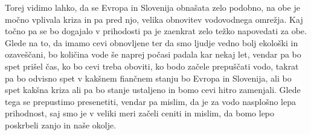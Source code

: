 \documentclass[11pt,a4paper]{article}
\begin{document}
Torej vidimo lahko, da se Evropa in Slovenija obnašata zelo podobno, na obe je močno vplivala kriza in pa pred njo, velika obnovitev vodovodnega omrežja. Kaj točno pa se bo dogajalo v prihodosti pa je zaenkrat zelo težko napovedati za obe. Glede na to, da imamo cevi obnovljene ter da smo ljudje vedno bolj ekološki in ozaveščani, bo količina vode še naprej počasi padala kar nekaj let, vendar pa bo spet prišel čas, ko bo cevi treba oboviti, ko bodo začele prepuščati vodo, takrat pa bo odvisno spet v kakšnem fiančnem stanju bo Evropa in Slovenija, ali bo spet kakšna kriza ali pa bo stanje ustaljeno in bomo cevi hitro zamenjali. Glede tega se prepustimo presenetiti, vendar pa mislim, da je za vodo nasplošno lepa prihodnost, saj smo je v veliki meri začeli ceniti in mislim, da bomo lepo poskrbeli zanjo in naše okolje.
\end{document}
